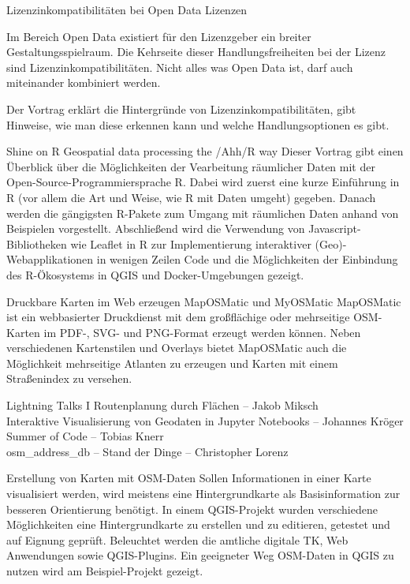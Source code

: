 %
{Lizenzinkompatibilitäten bei Open Data Lizenzen}%
{}%
{Im Bereich Open Data existiert für den Lizenzgeber ein breiter Gestaltungsspielraum. Die Kehrseite
  dieser Handlungsfreiheiten bei der Lizenz sind Lizenzinkompatibilitäten. Nicht alles was Open Data
  ist, darf auch miteinander kombiniert werden.

Der Vortrag erklärt die Hintergründe von Lizenzinkompatibilitäten, gibt Hinweise, wie man diese
erkennen kann und welche Handlungsoptionen es gibt.}

%
{Shine on R}%
{Geospatial data processing the /Ahh/R way}%
{Dieser Vortrag gibt einen Überblick über die Möglichkeiten der Vearbeitung räumlicher Daten mit der
  Open-Source-Programmiersprache R. Dabei wird zuerst eine kurze Einführung in R (vor allem die Art
  und Weise, wie R mit Daten umgeht) gegeben. Danach werden die gängigsten R-Pakete zum Umgang mit
  räumlichen Daten anhand von Beispielen vorgestellt. Abschließend wird die Verwendung von
  Javascript-Bibliotheken wie Leaflet in R zur Implementierung interaktiver (Geo)-Webapplikationen
  in wenigen Zeilen Code und die Möglichkeiten der Einbindung des R-Ökosystems in QGIS und
  Docker-Umgebungen gezeigt.}

%
{Druckbare Karten im Web erzeugen}%
{MapOSMatic und MyOSMatic}%
{%
  MapOSMatic ist ein webbasierter Druckdienst mit dem großflächige oder mehrseitige OSM-Karten im
  PDF-, SVG- und PNG-Format erzeugt werden können. Neben verschiedenen Kartenstilen und Overlays
  bietet MapOSMatic auch die Möglichkeit mehrseitige Atlanten zu erzeugen und Karten mit einem
  Straßenindex zu versehen.
}

\abstractNeun{}%
{Lightning Talks I}%
{}%
{Routenplanung durch Flächen -- Jakob Miksch\\
Interaktive Visualisierung von Geodaten in Jupyter Notebooks -- Johannes Kröger\\
Summer of Code -- Tobias Knerr\\
osm\_address\_db -- Stand der Dinge -- Christopher Lorenz}

%
{Erstellung von Karten mit OSM-Daten}%
{}%
{Sollen Informationen in einer Karte visualisiert werden, wird meistens eine
Hintergrundkarte als Basisinformation zur besseren Orientierung benötigt. In
einem QGIS-Projekt wurden verschiedene Möglichkeiten eine Hintergrundkarte zu
erstellen und zu editieren, getestet und auf Eignung geprüft. Beleuchtet werden
die amtliche digitale TK, Web Anwendungen sowie QGIS-Plugins. Ein geeigneter
Weg OSM-Daten in QGIS zu nutzen wird am Beispiel-Projekt gezeigt.}


\newpage
